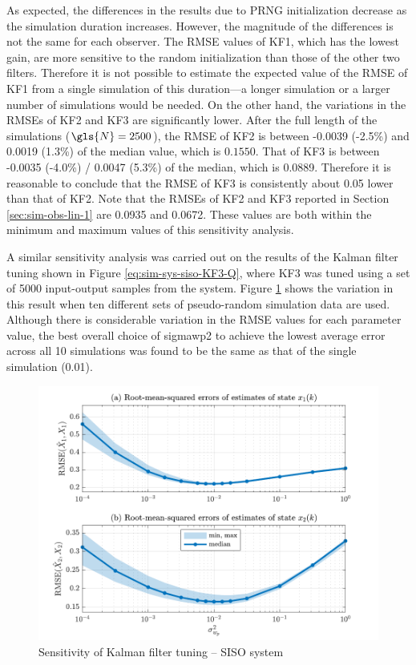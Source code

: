 As expected, the differences in the results due to \gls{PRNG} initialization decrease as the simulation duration increases. However, the magnitude of the differences is not the same for each observer. The \gls{RMSE} values of KF1, which has the lowest gain, are more sensitive to the random initialization than those of the other two filters. Therefore it is not possible to estimate the expected value of the \gls{RMSE} of KF1 from a single simulation of this duration---a longer simulation or a larger number of simulations would be needed. On the other hand, the variations in the \gls{RMSE}s of KF2 and KF3 are significantly lower. After the full length of the simulations ($\gls{N}=2500$), the \gls{RMSE} of KF2 is between -0.0039 (-2.5\%) and 0.0019 (1.3\%) of the median value, which is $0.1550$.  That of KF3 is between -0.0035 (-4.0\%) / 0.0047 (5.3\%) of the median, which is 0.0889.  Therefore it is reasonable to conclude that the \gls{RMSE} of KF3 is consistently about 0.05 lower than that of KF2. Note that the \gls{RMSE}s of KF2 and KF3 reported in Section \ref{sec:sim-obs-lin-1} are 0.0935 and 0.0672. These values are both within the minimum and maximum values of this sensitivity analysis.

A similar sensitivity analysis was carried out on the results of the Kalman filter tuning shown in Figure \ref{eq:sim-sys-siso-KF3-Q}, where KF3 was tuned using a set of 5000 input-output samples from the system. Figure \ref{fig:sim-sys-siso-KF3-sensitivity} shows the variation in this result when ten different sets of pseudo-random simulation data are used.  Although there is considerable variation in the \gls{RMSE} values for each parameter value, the best overall choice of \gls{sigmawp2} to achieve the lowest average error across all 10 simulations was found to be the same as that of the single simulation (0.01).

\begin{figure}[htp]
	\centering
	\includegraphics[width=14cm]{images/rod_obs_sim1_3KF_Q_statplot.pdf}
	\caption{Sensitivity of Kalman filter tuning – SISO system}
	\label{fig:sim-sys-siso-KF3-sensitivity}
\end{figure}


